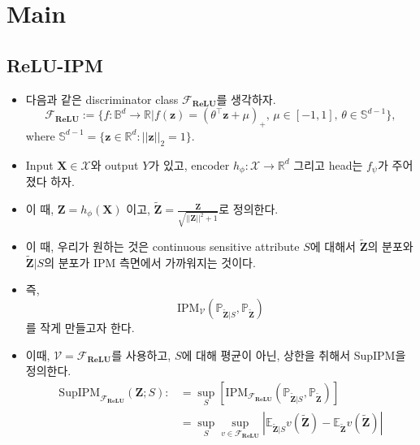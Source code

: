 \documentclass[10pt]{article}
\begin{document}
\section{Main}

\subsection{ReLU-IPM}

\begin{itemize}
    \item 다음과 같은 discriminator class $\mathcal{F}_{\mathbf{ReLU}}$를 생각하자.
    \begin{equation*}
        \mathcal{F}_{\mathbf{ReLU}} := \{f: \mathbb{B}^{d} \rightarrow \mathbb{R} | f(\mathbf{z}) = (\theta^{\top} \mathbf{z} + \mu)_{+},\, \mu \in [-1,1], \, \theta \in \mathbb{S}^{d-1}\}
        ,
    \end{equation*}
    where $\mathbb{S}^{d-1} = \{\mathbf{z} \in \mathbb{R}^{d} : || \mathbf{z} ||_{2} =1 \}$.
    \item Input $\mathbf{X} \in \mathcal{X}$와 output $Y$가 있고, encoder $h_{\phi}: \mathcal{X} \rightarrow \mathbb{R}^{d}$ 그리고 head는 $f_{\psi}$가 주어졌다 하자.
    \item 이 때, $\mathbf{Z} = h_{\phi}(\mathbf{X})$ 이고, $\tilde{\mathbf{Z}}  = \frac{\mathbf{Z}}{\sqrt{||\mathbf{Z}||^{2} + 1}}$로 정의한다.
    \item 이 때, 우리가 원하는 것은 continuous sensitive attribute $S$에 대해서 $\tilde{\mathbf{Z}}$의 분포와 $\tilde{\mathbf{Z}} |S$의 분포가 IPM 측면에서 가까워지는 것이다.
    \item 즉, 
    \begin{equation*}
        \mathrm{IPM}_{\mathcal{V}}(\mathbb{P}_{\tilde{\mathbf{Z}} |S} , \mathbb{P}_{\tilde{\mathbf{Z}}})
    \end{equation*}
    를 작게 만들고자 한다.
    \item 이때, $\mathcal{V} = \mathcal{F}_{\mathbf{ReLU}}$를 사용하고, $S$에 대해 평균이 아닌, 상한을 취해서 SupIPM을 정의한다.
    \begin{equation*}
    \begin{aligned}
        \mathrm{SupIPM}_{\mathcal{F}_{\mathbf{ReLU}}} (\mathbf{Z} ; S) :&= \sup_{S} [\mathrm{IPM}_{ \mathcal{F}_{\mathbf{ReLU}}}(\mathbb{P}_{\tilde{\mathbf{Z}} |S} , \mathbb{P}_{\tilde{\mathbf{Z}}})] \\
        &=\sup_{S} \sup_{v \in  \mathcal{F}_{\mathbf{ReLU}}} |\mathbb{E}_{\tilde{\mathbf{Z}} |S}v(\tilde{\mathbf{Z}})-         \mathbb{E}_{\tilde{\mathbf{Z}}}v(\tilde{\mathbf{Z}})| \\

\end{aligned}
\end{equation*}
\end{itemize}
\end{document}
